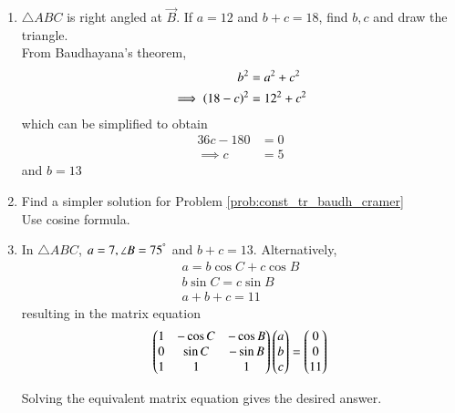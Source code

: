\begin{enumerate}[label=\arabic*.,ref=\thesubsection.\theenumi]
\item $\triangle ABC$ is right angled at $\vec{B}$.  If $a = 12$ and $b+c = 18$, find $b,c$ and draw the triangle.
\\
\solution From Baudhayana's theorem, 
\begin{align}
b^2 &= a^2 + c^2
\\
\implies \left(18-c\right)^2 &= 12^2 +c^2
\end{align}
which can be simplified to obtain
\begin{align}
 36c -180&= 0
\\
\implies c&=5
\end{align}
%
and $b = 13$
\item Find a simpler solution for  Problem \ref{prob:const_tr_baudh_cramer} 
\\
\solution Use cosine formula.
\item In $\triangle ABC$,  $a = 7, \angle B = 75^{\degree}$ and $b+c = 13$. 
Alternatively, 
\begin{align}
a = b \cos C + c \cos B
\\
b \sin C = c \sin B
\\
a + b+c = 11
\end{align}
%
resulting  in the matrix equation 
\begin{align}
\begin{pmatrix}
1 & -\cos C & - \cos B
\\
0 & \sin C &- \sin B
\\
1 & 1 & 1
\end{pmatrix}
\begin{pmatrix}a \\b\\c\end{pmatrix} = \begin{pmatrix}0 \\ 0 \\ 11\end{pmatrix}
\end{align}

Solving the equivalent matrix equation gives the desired answer.

\end{enumerate}
%
